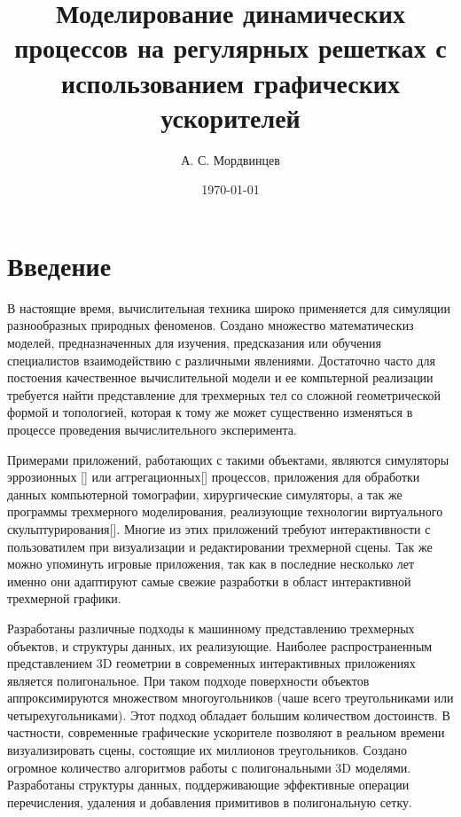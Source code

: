 \documentclass[a4paper,14pt]{extreport}
\begin{document}
\title{Моделирование динамических процессов на регулярных решетках с использованием графических ускорителей}
\author{А. С. Мордвинцев}
\date{\today}


\sloppy  %

\maketitle

\setcounter{page}{3}

\tableofcontents

\chapter*{Введение}

В настоящие время, вычислительная техника широко применяется для симуляции разнообразных природных феноменов. Создано множество математическиз моделей, предназначенных для изучения, предсказания или обучения специалистов взаимодействию с различными явлениями. Достаточно часто для постоения качественное вычислительной модели и ее компьтерной реализации требуется найти представление для трехмерных тел со сложной геометрической формой и топологией, которая к тому же может существенно изменяться в процессе проведения вычислительного эксперимента.

Примерами приложений, работающих с такими объектами, являются симуляторы эррозионных [] или аггрегационных[] процессов, приложения для обработки данных компьютерной томографии, хирургические симуляторы, а так же программы трехмерного моделирования, реализующие технологии виртуального скульптурирования[]. Многие из этих приложений требуют интерактивности с пользоватилем при визуализации и редактировании трехмерной сцены. Так же можно упоминуть игровые приложения, так как в последние несколько лет именно они адаптируют самые свежие разработки в област интерактивной трехмерной графики.

Разработаны различные подходы к машинному представлению трехмерных объектов, и структуры данных, их реализующие. Наиболее распространенным представлением 3D геометрии в современных интерактивных приложениях является полигональное. При таком подходе поверхности объектов аппроксимируются множеством многоугольников (чаше всего треугольниками или четырехугольниками). Этот подход обладает большим количеством достоинств. В частности, современные графические ускорителе позволяют в реальном времени визуализировать сцены, состоящие их миллионов треугольников. Создано огромное количество алгоритмов работы с полигональными 3D моделями. Разработаны структуры данных, поддерживающие эффективные операции перечисления, удаления и добавления примитивов в полигональную сетку.
\end{document}
